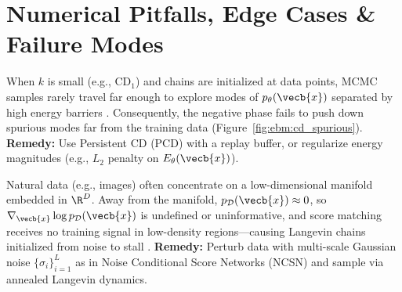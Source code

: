 \documentclass[../../../../master.tex]{subfiles}
\begin{document}
\section{Numerical Pitfalls, Edge Cases \& Failure Modes}
\label{sec:ebm:pitfalls}

\begin{pitfall}
When $k$ is small (e.g., $\mathrm{CD}_1$) and chains are initialized at data points, MCMC samples rarely travel far enough to explore modes of $p_\theta(\vecb{x})$ separated by high energy barriers . Consequently, the negative phase fails to push down spurious modes far from the training data (Figure~\ref{fig:ebm:cd_spurious}). \textbf{Remedy:} Use Persistent CD (PCD) with a replay buffer, or regularize energy magnitudes (e.g., $L_2$ penalty on $E_\theta(\vecb{x})$).
\end{pitfall}


\begin{pitfall}
Natural data (e.g., images) often concentrate on a low-dimensional manifold embedded in $\R^D$. Away from the manifold, $p_{\mathcal{D}}(\vecb{x}) \approx 0$, so $\nabla_{\vecb{x}}\log p_{\mathcal{D}}(\vecb{x})$ is undefined or uninformative, and score matching receives no training signal in low-density regions—causing Langevin chains initialized from noise to stall . \textbf{Remedy:} Perturb data with multi-scale Gaussian noise $\{\sigma_i\}_{i=1}^L$ as in Noise Conditional Score Networks (NCSN) and sample via annealed Langevin dynamics.
\end{pitfall}
\end{document}
